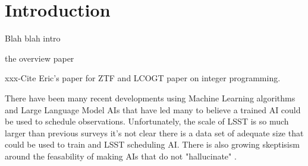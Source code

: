 \documentclass[]{aastex631}
\begin{document}


\section{Introduction} \label{sec:intro}
Blah blah intro

the overview paper \citet{Rubin_overview2019}

xxx-Cite Eric's paper for ZTF \citep{Bellm2019} and LCOGT paper \citep{Lampoudi2015} on integer programming.

There have been many recent developments using Machine Learning algorithms and Large Language Model AIs that have led many to believe a trained AI could be used to schedule observations. Unfortunately, the scale of LSST is so much larger than previous surveys it's not clear there is a data set of adequate size that could be used to train and LSST scheduling AI. There is also growing skeptisism around the feasability of making AIs that do not "hallucinate" \citep{Hicks24}.
\end{document}
